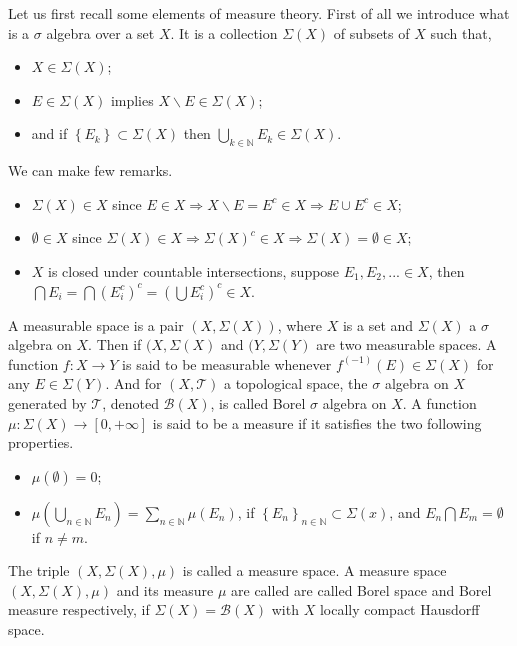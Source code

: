 \documentclass[10pt]{book}
\newcommand{\Tcal}{\mathcal{T}}
\theoremstyle{break}
\begin{document}
Let us first recall some elements of measure theory. First of all we introduce what is a $\sigma$ algebra over a set $X$. It is a collection $\Sigma(X)$ of subsets of $X$ such that,
%
\begin{itemize}
\item $X \in \Sigma(X)$; 
\item $E \in \Sigma(X)$ implies $X \backslash E \in \Sigma(X)$;
\item and if $\left\{ E_k \right\} \subset \Sigma(X)$ then $\underset{k \in \mathbb{N}}{\bigcup} E_k \in \Sigma(X)$.
\end{itemize}
%
We can make few remarks. 
%
\begin{itemize}
\item $\Sigma(X) \in X$ since $E \in X \Rightarrow X \backslash E = E^c \in X \Rightarrow E \cup E^c \in X$;
%
\item $\emptyset \in X$ since $\Sigma(X) \in X \Rightarrow \Sigma(X)^c \in X \Rightarrow \Sigma(X) = \emptyset \in X$;
%
\item $X$ is closed under countable intersections, suppose $E_1, E_2, ... \in X$, then $\bigcap E_i = \bigcap (E_i^c)^c = ( \bigcup E_i^c )^c \in X$.
\end{itemize}
%
A measurable space is a pair $(X, \Sigma(X))$, where $X$ is a set and $\Sigma(X)$ a $\sigma$ algebra on $X$.
%
Then if $(X,\Sigma(X)$ and $(Y,\Sigma(Y)$ are two measurable spaces. A function $f : X \to Y$ is said to be measurable whenever $f^{(-1)}(E) \in \Sigma(X)$ for any $E \in \Sigma(Y)$. 
%
And for $(X,\Tcal)$ a topological space, the $\sigma$ algebra on $X$ generated by $\Tcal$, denoted $\mathcal{B}(X)$, is called Borel $\sigma$ algebra on $X$.
%
A function $\mu : \Sigma(X) \to [0,+\infty]$ is said to be a measure if it satisfies the two following properties.
%
\begin{itemize}
\item $\mu(\emptyset) = 0$;
\item $\mu\left( \underset{n \in \mathbb{N}}{\bigcup} E_n \right) = \underset{n \in \mathbb{N}}{\sum} \mu(E_n)$, if $\left\{E_n\right\}_{n\in\mathbb{N}} \subset \Sigma(x)$, and $E_n \bigcap E_m = \emptyset$ if $n\neq m$.
\end{itemize}
%
The triple $(X,\Sigma(X),\mu)$ is called a measure space. 
%
A measure space $(X, \Sigma(X), \mu)$ and its measure $\mu$ are called are called Borel space and Borel measure respectively, if $\Sigma(X) = \mathcal{B}(X)$ with $X$ locally compact Hausdorff space.


\bigskip
\end{document}
